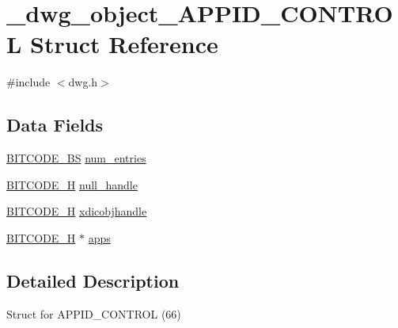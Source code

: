 \hypertarget{struct__dwg__object__APPID__CONTROL}{\section{\-\_\-dwg\-\_\-object\-\_\-\-A\-P\-P\-I\-D\-\_\-\-C\-O\-N\-T\-R\-O\-L \-Struct \-Reference}
\label{struct__dwg__object__APPID__CONTROL}
}


{\ttfamily \#include $<$dwg.\-h$>$}

\subsection*{\-Data \-Fields}
\begin{DoxyCompactItemize}
\item 
\hyperlink{dwg_8h_a94297606fbd4a4ff97e8add284af0809}{\-B\-I\-T\-C\-O\-D\-E\-\_\-\-B\-S} \hyperlink{struct__dwg__object__APPID__CONTROL_a054b1376a051612006bcd12ca1f3a8a8}{num\-\_\-entries}
\item 
\hyperlink{dwg_8h_a7c700e94e047a97ba8c24bdfe4029dc3}{\-B\-I\-T\-C\-O\-D\-E\-\_\-\-H} \hyperlink{struct__dwg__object__APPID__CONTROL_a7bc0cd78a727c0a42f3856b4685556d9}{null\-\_\-handle}
\item 
\hyperlink{dwg_8h_a7c700e94e047a97ba8c24bdfe4029dc3}{\-B\-I\-T\-C\-O\-D\-E\-\_\-\-H} \hyperlink{struct__dwg__object__APPID__CONTROL_a69bcc1630fe6179e4c312b2b100ad579}{xdicobjhandle}
\item 
\hyperlink{dwg_8h_a7c700e94e047a97ba8c24bdfe4029dc3}{\-B\-I\-T\-C\-O\-D\-E\-\_\-\-H} $\ast$ \hyperlink{struct__dwg__object__APPID__CONTROL_a44a1032082a908b163084e412a7af76f}{apps}
\end{DoxyCompactItemize}


\subsection{\-Detailed \-Description}
\-Struct for \-A\-P\-P\-I\-D\-\_\-\-C\-O\-N\-T\-R\-O\-L (66) 

